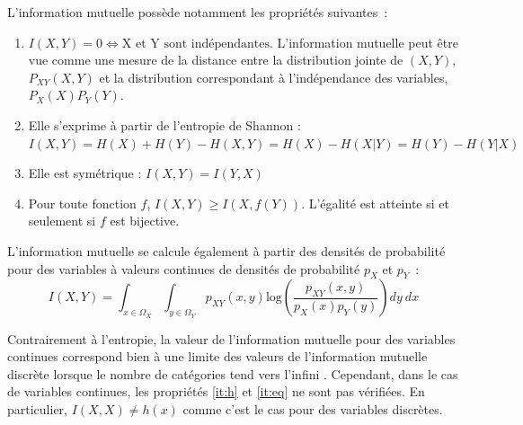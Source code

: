\documentclass[../main]{subfiles}
\begin{document}
L'information mutuelle possède notamment les propriétés suivantes~:
\begin{enumerate}
\item $I(X,Y) = 0 \Leftrightarrow \textrm{X et Y sont indépendantes}$. L'information mutuelle peut être vue comme une mesure de la distance entre la distribution jointe de $(X,Y)$, $P_{XY}(X,Y)$ et la distribution correspondant à l'indépendance des variables, $P_X(X)P_Y(Y)$.
\item\label{it:h} Elle s'exprime à partir de l'entropie de Shannon : $I(X,Y) = H(X) + H(Y) - H(X,Y) = H(X) - H(X|Y) = H(Y) - H(Y|X)$
\item Elle est symétrique : $I(X,Y) = I(Y,X)$
\item\label{it:eq} Pour toute fonction $f$, $I(X,Y) \geq I(X,f(Y))$. L'égalité est atteinte si et seulement si $f$ est bijective.
\end{enumerate}

L'information mutuelle se calcule également à partir des densités de probabilité pour des variables à valeurs continues de densités de probabilité $p_X$ et $p_Y$~:
\begin{equation}
    I(X,Y) = \int_{x \in \Omega_X}\int_{y \in \Omega_Y }{p_{XY}(x,y)\textrm{log}(\frac{p_{XY}(x,y)}{p_X(x)p_Y(y)})dy \: dx}
\end{equation}

Contrairement à l'entropie, la valeur de l'information mutuelle pour des variables continues correspond bien à une limite des valeurs de l'information mutuelle discrète lorsque le nombre de catégories tend vers l'infini \parencite{Cover2005ElementsOI}.
Cependant, dans le cas de variables continues, les propriétés \ref{it:h} et \ref{it:eq} ne sont pas vérifiées. 
En particulier, $I(X,X) \neq h(x)$ comme c'est le cas pour des variables discrètes.
\end{document}
